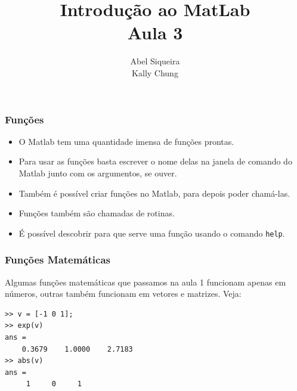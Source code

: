 \documentclass{beamer}
\title{Introdu\c{c}\~ao ao MatLab \\ Aula 3}
\author{Abel Siqueira \\ Kally Chung}
\date{}
\begin{document}
\frame{\titlepage}

\section[Fun\c{c}\~oes]{}
\begin{frame}[fragile]

  \frametitle{Fun\c{c}\~oes}
  
  \begin{itemize}
  \item<1-> O Matlab tem uma quantidade imensa de fun\c{c}\~oes prontas.
  \item<2-> Para usar as fun\c{c}\~oes basta escrever o nome delas na janela de comando do Matlab junto com os argumentos, se ouver.
  \item<3-> Tamb\'em \'e poss\'ivel criar fun\c{c}\~oes no Matlab, para depois poder cham\'a-las.
  \item<4-> Fun\c{c}\~oes tamb\'em s\~ao chamadas de rotinas.
  \item<5-> \'E poss\'ivel descobrir para que serve uma fun\c{c}\~ao usando o comando {\tt help}.
  \end{itemize}

\end{frame}

\begin{frame}[fragile]
\frametitle{Fun\c{c}\~oes Matem\'aticas}
Algumas fun\c{c}\~oes matem\'aticas que passamos na aula 1 funcionam apenas em n\'umeros, outras tamb\'em funcionam em vetores e matrizes. Veja:
{\scriptsize
\begin{verbatim}
>> v = [-1 0 1];
>> exp(v)
ans =
    0.3679    1.0000    2.7183
>> abs(v)
ans =
     1     0     1
\end{verbatim}
}

\end{frame}

\subsection[Arquivos m]{}
\end{document}
